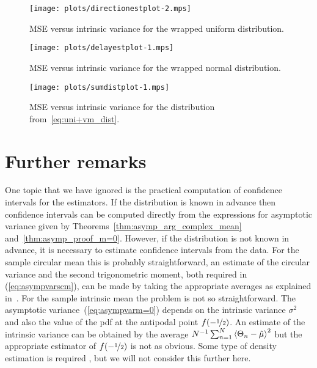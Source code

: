 \documentclass[journal]{../bib/IEEEtran}
\begin{document}
\begin{figure}[p]
	\centering
		\texttt{[image: plots/directionestplot-2.mps]}
		\caption{MSE versus intrinsic variance for the wrapped uniform distribution.}
		\label{fig:directionest_Uniform}
\end{figure}

\begin{figure}[p]
	\centering
		\texttt{[image: plots/delayestplot-1.mps]}
		\caption{MSE versus intrinsic variance for the wrapped normal distribution.}
		\label{fig:directionest_normal}
\end{figure}

\begin{figure}[p]
	\centering
		\texttt{[image: plots/sumdistplot-1.mps]}
		\caption{MSE versus intrinsic variance for the distribution from~\eqref{eq:uni+vm_dist}.}
		\label{fig:directionest_sumdist}
\end{figure}



\section{Further remarks}

One topic that we have ignored is the practical computation of confidence intervals for the estimators.  If the distribution is known in advance then confidence intervals can be computed directly from the expressions for asymptotic variance given by Theorems~\ref{thm:asymp_arg_complex_mean} and~\ref{thm:asymp_proof_m=0}.  However, if the distribution is not known in advance, it is necessary to estimate confidence intervals from the data.  For the sample circular mean this is probably straightforward, an estimate of the circular variance and the second trigonometric moment, both required in (\ref{eq:asympvarscm}), can be made by taking the appropriate averages as explained in~\cite{Fisher_common_mean_direction_dir_est_no_dist_assumptions1983}. For the sample intrinsic mean the problem is not so straightforward. The asymptotic variance~(\ref{eq:asympvarm=0}) depends on the intrinsic variance $\sigma^2$ and also the value of the pdf at the antipodal point $f(-\nicefrac{1}{2})$. An estimate of the intrinsic variance can be obtained by the average $N^{-1}\sum_{n=1}^{N}\left< \Theta_n - \hat{\mu} \right>^2$ but the appropriate estimator of $f(-\nicefrac{1}{2})$ is not as obvious. Some type of density estimation is required \cite{Fisher1989smoothingcircdata,Rosenblatt_dens_est_1956,Parzen_dens_est_1962}, but we will not consider this further here. 
\end{document}
